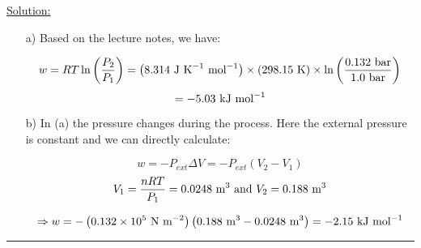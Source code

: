 \noindent
\underline{Solution:}\\

\begin{itemize}
\item[a)] Based on the lecture notes, we have:

$$w = RT\ln\left(\frac{P_2}{P_1}\right) = \left(8.314\textnormal{ J K}^{-1}\textnormal{ mol}^{-1}\right)\times\left(298.15\textnormal{ K}\right)\times\ln\left(\frac{0.132\textnormal{ bar}}{1.0\textnormal{ bar}}\right)$$
$$ = -5.03\textnormal{ kJ mol}^{-1}$$

\item[b)] In (a) the pressure changes during the process. Here the external pressure is constant and we can directly calculate:

$$w = -P_{ext}\Delta V = -P_{ext}\left(V_2 - V_1\right)$$
$$V_1 = \frac{nRT}{P_1} = 0.0248\textnormal{ m}^3\textnormal{ and }V_2 = 0.188\textnormal{ m}^3$$

$$\Rightarrow w = -\left(0.132\times 10^5\textnormal{ N m}^{-2}\right)\left(0.188\textnormal{ m}^3 - 0.0248\textnormal{ m}^3\right) = -2.15\textnormal{ kJ mol}^{-1}$$

\end{itemize}

\hrule\vspace{0.5cm}
